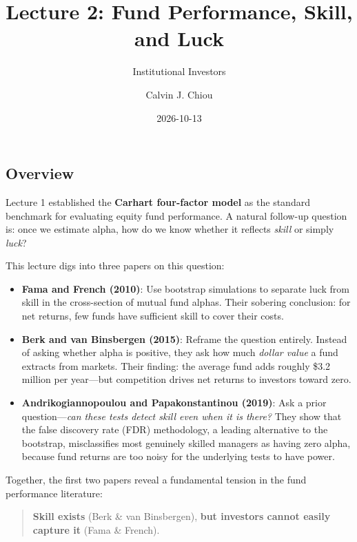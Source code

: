 \documentclass[
  letterpaper,
  DIV=11,
  numbers=noendperiod]{scrartcl}
\title{Lecture 2: Fund Performance, Skill, and Luck}
\subtitle{Institutional Investors}
\author{Calvin J. Chiou}
\date{2026-10-13}
\providecommand{\tightlist}{%
  \setlength{\itemsep}{0pt}\setlength{\parskip}{0pt}}
\renewcommand*\contentsname{Table of contents}
\newcommand\contentsname{Table of contents}
\begin{document}
\maketitle

\renewcommand*\contentsname{Table of contents}
{
\setcounter{tocdepth}{3}
\tableofcontents
}

\subsection{Overview}\label{overview}

Lecture 1 established the \textbf{Carhart four-factor model} as the
standard benchmark for evaluating equity fund performance. A natural
follow-up question is: once we estimate alpha, how do we know whether it
reflects \emph{skill} or simply \emph{luck}?

This lecture digs into three papers on this question:

\begin{itemize}
\tightlist
\item
  \textbf{Fama and French (2010)}: Use bootstrap simulations to separate
  luck from skill in the cross-section of mutual fund alphas. Their
  sobering conclusion: for net returns, few funds have sufficient skill
  to cover their costs.
\item
  \textbf{Berk and van Binsbergen (2015)}: Reframe the question
  entirely. Instead of asking whether alpha is positive, they ask how
  much \emph{dollar value} a fund extracts from markets. Their finding:
  the average fund adds roughly \$3.2 million per year---but competition
  drives net returns to investors toward zero.
\item
  \textbf{Andrikogiannopoulou and Papakonstantinou (2019)}: Ask a prior
  question---\emph{can these tests detect skill even when it is there?}
  They show that the false discovery rate (FDR) methodology, a leading
  alternative to the bootstrap, misclassifies most genuinely skilled
  managers as having zero alpha, because fund returns are too noisy for
  the underlying tests to have power.
\end{itemize}

Together, the first two papers reveal a fundamental tension in the fund
performance literature:

\begin{quote}
\textbf{Skill exists} (Berk \& van Binsbergen), \textbf{but investors
cannot easily capture it} (Fama \& French).
\end{quote}
\end{document}

